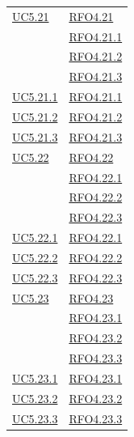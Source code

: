 \begin{itemize}
\begin{itemize}
\begin{itemize}
\begin{itemize}
\begin{longtable}{|>{\centering}m{5cm}|m{5cm}<{\centering}|}
\hyperref[UC5.21]{UC5.21} & \hyperlink{RFO4.21}{RFO4.21}\\
& \hyperlink{RFO4.21.1}{RFO4.21.1}\\
& \hyperlink{RFO4.21.2}{RFO4.21.2}\\
& \hyperlink{RFO4.21.3}{RFO4.21.3}\\ \hline
\hyperref[UC5.21.1]{UC5.21.1} & \hyperlink{RFO4.21.1}{RFO4.21.1}\\\hline
\hyperref[UC5.21.2]{UC5.21.2} & \hyperlink{RFO4.21.2}{RFO4.21.2}\\\hline
\hyperref[UC5.21.3]{UC5.21.3} & \hyperlink{RFO4.21.3}{RFO4.21.3}\\\hline

\hyperref[UC5.22]{UC5.22} & \hyperlink{RFO4.22}{RFO4.22}\\
& \hyperlink{RFO4.22.1}{RFO4.22.1}\\
& \hyperlink{RFO4.22.2}{RFO4.22.2}\\
& \hyperlink{RFO4.22.3}{RFO4.22.3}\\ \hline
\hyperref[UC5.22.1]{UC5.22.1} & \hyperlink{RFO4.22.1}{RFO4.22.1}\\\hline
\hyperref[UC5.22.2]{UC5.22.2} & \hyperlink{RFO4.22.2}{RFO4.22.2}\\\hline
\hyperref[UC5.22.3]{UC5.22.3} & \hyperlink{RFO4.22.3}{RFO4.22.3}\\\hline

\hyperref[UC5.23]{UC5.23} & \hyperlink{RFO4.23}{RFO4.23}\\
& \hyperlink{RFO4.23.1}{RFO4.23.1}\\
& \hyperlink{RFO4.23.2}{RFO4.23.2}\\
& \hyperlink{RFO4.23.3}{RFO4.23.3}\\ \hline
\hyperref[UC5.23.1]{UC5.23.1} & \hyperlink{RFO4.23.1}{RFO4.23.1}\\\hline
\hyperref[UC5.23.2]{UC5.23.2} & \hyperlink{RFO4.23.2}{RFO4.23.2}\\\hline
\hyperref[UC5.23.3]{UC5.23.3} & \hyperlink{RFO4.23.3}{RFO4.23.3}\\\hline


\end{longtable}
\end{itemize}
\end{itemize}
\end{itemize}
\end{itemize}
